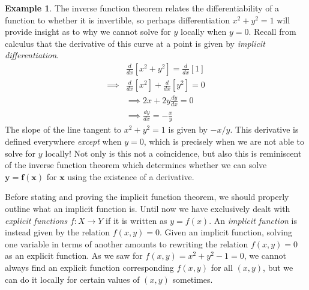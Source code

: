 \documentclass{article}
\newcommand{\x}{\mathbf{x}}
\newcommand{\f}{\mathbf{f}}
\newcommand{\y}{\mathbf{y}}
\theoremstyle{definition}
\newtheorem{example}{Example}[section]
\begin{document}
\begin{example}
	The inverse function theorem relates the differentiability of a function to whether it is invertible, so perhaps differentiation $ x^2+y^2=1 $ will provide insight as to why we cannot solve for $ y $ locally when $ y= 0 $. Recall from calculus that the derivative of this curve at a point is given by \textit{\color{red}implicit differentiation}.
	\begin{align*}
		&\frac{d}{dx}[x^2+y^2]=\frac{d}{dx}[1]\\
		\implies & \frac{d}{dx}[x^2]+ \frac{d}{dx} [y^2]=0 \\
		& \implies 2x + 2y \frac{dy}{dx} = 0\\
		&\implies \frac{dy}{dx}=-\frac{x}{y}
	\end{align*} 
	The slope of the line tangent to $ x^2+y^2=1 $ is given by $ -x/y $. This derivative is defined everywhere \textit{except} when $ y=0 $, which is precisely when we are not able to solve for $ y $ locally! Not only is this not a coincidence, but also this is reminiscent of the inverse function theorem which determines whether we can solve $ \y=\f(\x) $ for $ \x $ using the existence of a derivative. 
\end{example}  
Before stating and proving the implicit function theorem, we should properly outline what an implicit function is. Until now we have exclusively dealt with \textit{\color{red}explicit functions} $ f:X\to Y $ if it is written as $ y=f(x) $. An \textit{\color{red}implicit function} is instead given by the relation $ f(x,y)=0 $. Given an implicit function, solving one variable in terms of another amounts to rewriting the relation $ f(x,y)=0 $ as an explicit function. As we saw for $ f(x,y) = x^2+y^2-1=0 $, we cannot always find an explicit function corresponding $ f(x,y) $ for all $ (x,y) $, but we can do it locally for certain values of $ (x,y) $ sometimes. 
\end{document}
